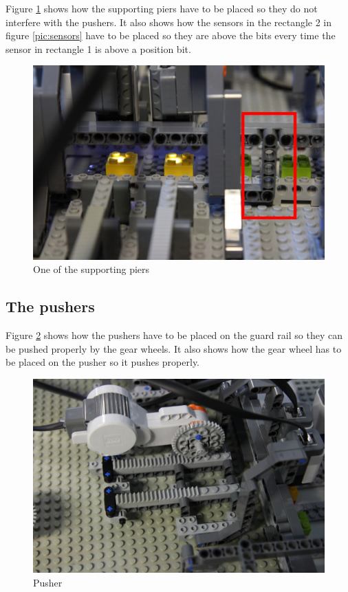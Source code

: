 \documentclass[%
  a4paper,%
  11pt,%
  blue,%
  hyperref	%
  ]{tubsartcl}
\begin{document}
\newpage

Figure \ref{pic:supporting_pier} shows how the supporting piers have to be placed so they do not interfere with the pushers. It also shows how the sensors in the rectangle 2 in figure \ref{pic:sensors} have to be placed so they are above the bits every time the sensor in rectangle 1 is above a position bit.

\begin{figure}[!htb]
\begin{center}
\includegraphics[scale=0.3]{graphics_lego/supporting_pier.jpg}
\end{center}
\caption{One of the supporting piers}
\label{pic:supporting_pier}
\end{figure}

\newpage

\subsection{The pushers}

Figure \ref{pic:pusher} shows how the pushers have to be placed on the guard rail so they can be pushed properly by the gear wheels. It also shows how the gear wheel has to be placed on the pusher so it pushes properly.

\begin{figure}[!htb]
\begin{center}
\includegraphics[scale=0.3]{graphics_lego/pusher.jpg}
\end{center}
\caption{Pusher}
\label{pic:pusher}
\end{figure}
\end{document}
